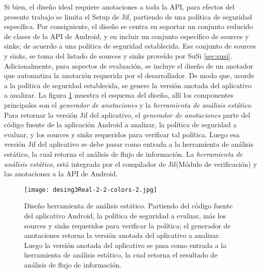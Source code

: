 Si bien, el diseño ideal requiere anotaciones a toda la API, para efectos del
presente trabajo se limita el Setup de Jif, partiendo de una política de
seguridad específica.
Por consiguiente, el diseño se centra en soportar un conjunto reducido de clases
de la API de Android, y en incluir un conjunto específico de sources y
sinks; de acuerdo a una política de seguridad establecida. Ese conjunto de
sources y sinks, se toma del listado de sources y sinks proveído por SuSi
\ref{sec:susi}.\newline
Adicionalmente, para aspectos de evaluación, se incluye el diseño de un anotador
que automatiza la anotación requerida por el desarrollador.
De modo que, acorde a la política de seguridad establecida, se genere la
versión anotada del aplicativo a analizar.\newline
La figura \ref{fig:desingReal} muestra el esquema del diseño, allí los componentes
principales son el \emph{generador de anotaciones} y la \emph{herramienta de
análisis estático}.\newline 
Para retornar la versión Jif del aplicativo, el \emph{generador de anotaciones}
parte del código fuente de la aplicación Android a analizar, la política de
seguridad a evaluar, y los sources y sinks requeridos para verificar tal
política.\newline 
Luego esa versión Jif del aplicativo se debe pasar como entrada a la herramienta
de análisis estático, la cual retorna el análisis de flujo de
información.\newline 
La \emph{herramienta de análisis estático}, está integrada
por el compilador de Jif(Módulo de verificación) y las anotaciones a la API de
Android.

\begin{figure}[t!]
	\begin{center} 
	\texttt{[image: desing3Real-2-2-colors-2.jpg]} 
	\end{center}
	\caption{Diseño herramienta de análisis estático.\newline
	Partiendo del código fuente del aplicativo Android, la política de seguridad a
	evaluar, más los sources y sinks requeridos para verificar la política; el
	generador de anotaciones retorna la versión anotada del aplicativo a analizar.
	Luego la versión anotada del aplicativo se pasa como entrada a la herramienta
	de análisis estático, la cual retorna el resultado de análisis de flujo de información.}
	\label{fig:desingReal}
\end{figure}

